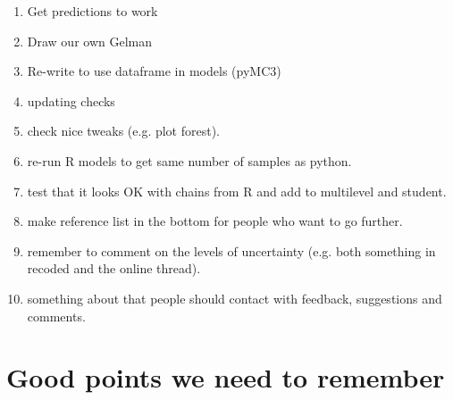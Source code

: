 \documentclass[12pt]{article}
\begin{document}
\begin{enumerate}
	\item Get predictions to work \\
	\item Draw our own Gelman \\
	\item Re-write to use dataframe in models (pyMC3) \\
	\item updating checks \\
	\item check nice tweaks (e.g. plot forest). \\
	\item re-run R models to get same number of samples as python. \\
	\item test that it looks OK with chains from R and add to multilevel
		and student.
	\item make reference list in the bottom for people who want to go
		further. \\
	\item remember to comment on the levels of uncertainty
		(e.g. both something in recoded and the online thread). \\
	\item something about that people should contact with feedback,
		suggestions and comments.
\end{enumerate}

\section{Good points we need to remember}
\end{document}

